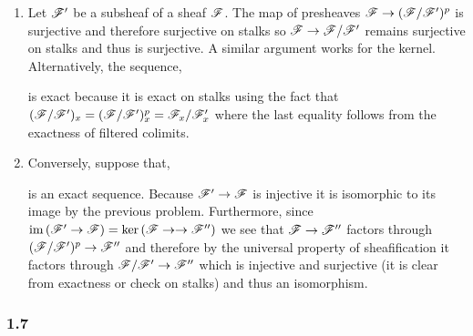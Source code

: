 \documentclass[12pt]{article}
\begin{document}
\begin{enumerate}
\item Let $\mathscr{F}'$ be a subsheaf of a sheaf $\mathscr{F}$. The map of presheaves $\mathscr{F} \to (\mathscr{F} / \mathscr{F}')^p$ is surjective and therefore surjective on stalks so $\mathscr{F} \to \mathscr{F} / \mathscr{F}'$ remains surjective on stalks and thus is surjective. A similar argument works for the kernel. Alternatively, the sequence,
\begin{center}
\end{center}
is exact because it is exact on stalks using the fact that $(\mathscr{F} / \mathscr{F}')_x = (\mathscr{F} / \mathscr{F}')_x^p = \mathscr{F}_x / \mathscr{F}'_x$ where the last equality follows from the exactness of filtered colimits.

\item Conversely, suppose that,
\begin{center}
\end{center}
is an exact sequence. Because $\mathscr{F}' \to \mathscr{F}$ is injective it is isomorphic to its image by the previous problem. Furthermore, since $\operatorname{\mathrm{im}}{(\mathscr{F}' \to \mathscr{F})} = \ker{(\mathscr{F}\to \to \mathscr{F}'')}$ we see that $\mathscr{F} \to \mathscr{F}''$ factors through $(\mathscr{F} / \mathscr{F}')^p \to \mathscr{F}''$ and therefore by the universal property of sheafification it factors through $\mathscr{F} / \mathscr{F}' \to \mathscr{F}''$ which is injective and surjective (it is clear from exactness or check on stalks) and thus an isomorphism.
\end{enumerate}

\subsubsection{1.7}
\end{document}

